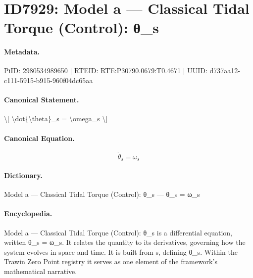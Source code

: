 \section*{ID7929: Model a — Classical Tidal Torque (Control): θ\_s}
\paragraph{Metadata.}
PiID: 2980534989650 | RTEID: RTE:P30790.0679:T0.4671 | UUID: d737aa12-c111-5915-b915-960f04dc65aa

\paragraph{Canonical Statement.}
\textbackslash{}[ \textbackslash{}dot\{\textbackslash{}theta\}\_s = \textbackslash{}omega\_s \textbackslash{}]

\paragraph{Canonical Equation.}
\[
\dot{\theta}_s = \omega_s
\]

\paragraph{Dictionary.}
Model a — Classical Tidal Torque (Control): θ\_s — θ\_s = ω\_s

\paragraph{Encyclopedia.}
Model a — Classical Tidal Torque (Control): θ\_s is a differential equation, written θ\_s = ω\_s. It relates the quantity to its derivatives, governing how the system evolves in space and time. It is built from s, defining θ\_s. Within the Trawin Zero Point registry it serves as one element of the framework's mathematical narrative.
